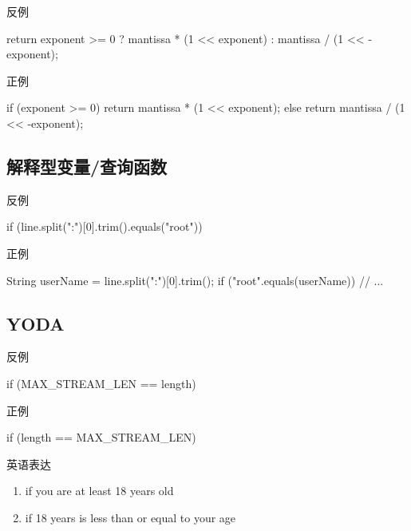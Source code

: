 \begin{frame}[fragile]{反例}
  \begin{java}
return exponent >= 0 ? mantissa * (1 << exponent) : mantissa / (1 << -exponent);
  \end{java}
\end{frame}

\begin{frame}[fragile]{正例}
  \begin{java}
if (exponent >= 0) {
  return mantissa * (1 << exponent);
} else {
  return mantissa / (1 << -exponent);
}
  \end{java}
\end{frame}

\subsection{解释型变量/查询函数}

\begin{frame}[fragile]{反例}
  \begin{java}
if (line.split(":")[0].trim().equals("root"))
  \end{java}
\end{frame}

\begin{frame}[fragile]{正例}
  \begin{java}
String userName = line.split(":")[0].trim();
if ("root".equals(userName)) {
  // ...
}
  \end{java}
\end{frame}

\subsection{YODA}

\begin{frame}[fragile]{反例}
  \begin{java}
if (MAX_STREAM_LEN == length)
  \end{java}
\end{frame}

\begin{frame}[fragile]{正例}
  \begin{java}
if (length == MAX_STREAM_LEN)
  \end{java}
\end{frame}

\begin{frame}[fragile]{英语表达}
\begin{enumerate}
  \item if you are at least 18 years old
  \item if 18 years is less than or equal to your age
\end{enumerate}
\end{frame}
